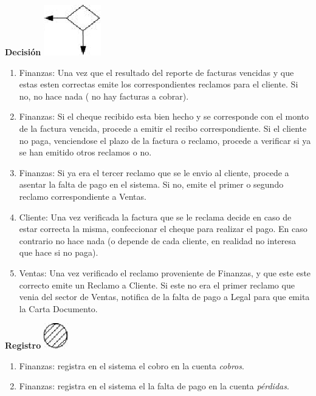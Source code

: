 \begin{center}
  \textbf{Decisión}
  \includegraphics{./Images/Simbolos/simbolo-Decision.png}
\end{center}
\begin{enumerate}
\item Finanzas: Una vez que el resultado del reporte de facturas vencidas y que estas esten correctas emite los correspondientes reclamos para el cliente. Si no, no hace nada ( no hay facturas a cobrar).
\item Finanzas: Si el cheque recibido esta bien hecho y se corresponde con el monto de la factura vencida, procede a emitir el recibo correspondiente. Si el cliente no paga, venciendose el plazo de la factura o reclamo, procede a verificar si ya se han emitido otros reclamos o no.
\item Finanzas: Si ya era el tercer reclamo que se le envio al cliente, procede a asentar la falta de pago en el sistema. Si no, emite el primer o segundo reclamo correspondiente a Ventas.
\item Cliente: Una vez verificada la factura que se le reclama decide en caso de estar correcta la misma, confeccionar el cheque para realizar el pago. En caso contrario no hace nada (o depende de cada cliente, en realidad no interesa que hace si no paga).
\item Ventas: Una vez verificado el reclamo proveniente de Finanzas, y que este este correcto emite un Reclamo a Cliente. Si este no era el primer reclamo que venia del sector de Ventas, notifica de la falta de pago a Legal para que emita la Carta Documento.
\end{enumerate}

\begin{center}
  \textbf{Registro}
  \includegraphics{./Images/Simbolos/simbolo-Registro.png}
\end{center}
\begin{enumerate}
\item Finanzas: registra en el sistema el cobro en la cuenta \textit{cobros}.
\item Finanzas: registra en el sistema el la falta de pago en la cuenta \textit{pérdidas}.
\end{enumerate}

